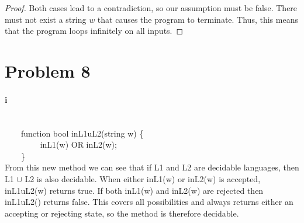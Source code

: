 \documentclass[10pt,letter]{article}
\begin{document}
{\begin{proof}
Both cases lead to a contradiction, so our assumption must be false. There must not exist a string $w$ that causes the program to terminate. Thus, this means that the program loops infinitely on all inputs. 
\end{proof}
\section*{Problem 8}
\paragraph{i}
\ \\
{\selectfont
$\qquad$function bool inL1uL2(string w) \{ \\
$\qquad$$\qquad$  inL1(w) OR inL2(w); \\
$\qquad$\} \\}
From this new method we can see that if L1 and L2 are decidable languages, then L1 $\cup$ L2 is also decidable. When either {\selectfont inL1(w)} or {\selectfont inL2(w)} is accepted, {\selectfont inL1uL2(w)} returns true. If both {\selectfont inL1(w)} and {\selectfont inL2(w)} are rejected then {\selectfont inL1uL2()} returns false. This covers all possibilities and always returns either an accepting or rejecting state, so the method is therefore decidable. 

}
\end{document}
